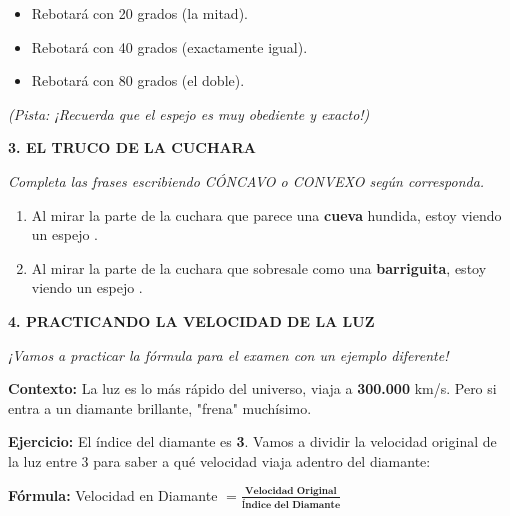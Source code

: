 \documentclass[12pt, letterpaper]{article}
\newcommand{\boxfill}[1][2.5cm]{\tcbox[on line, size=minimal, colframe=valdark!80, colback=white, boxrule=0.5pt, arc=1mm, boxsep=3pt, left=2pt, right=2pt, top=2pt, bottom=2pt]{\hspace*{#1}\vphantom{M}}}
\begin{document}
\vspace{0.2cm}
\begin{itemize}[itemsep=0.3cm]
    \item[$\square$] Rebotará con 20 grados (la mitad).
    \item[$\square$] Rebotará con 40 grados (exactamente igual).
    \item[$\square$] Rebotará con 80 grados (el doble).
\end{itemize}
\noindent \textit{(Pista: ¡Recuerda que el espejo es muy obediente y exacto!)}

\vspace{0.6cm}

\noindent \textbf{\textcolor{valblue}{3. EL TRUCO DE LA CUCHARA}}

\vspace{0.2cm}
\noindent \textit{Completa las frases escribiendo CÓNCAVO o CONVEXO según corresponda.}

\vspace{0.2cm}
\begin{enumerate}[label=\Alph*), itemsep=0.4cm]
    \item Al mirar la parte de la cuchara que parece una \textbf{cueva} hundida, estoy viendo un espejo \boxfill.
    \item Al mirar la parte de la cuchara que sobresale como una \textbf{barriguita}, estoy viendo un espejo \boxfill.
\end{enumerate}

\newpage %

\noindent \textbf{\textcolor{valblue}{4. PRACTICANDO LA VELOCIDAD DE LA LUZ}}

\vspace{0.2cm}
\noindent \textit{¡Vamos a practicar la fórmula para el examen con un ejemplo diferente!}

\vspace{0.2cm}
\noindent \textbf{Contexto:} La luz es lo más rápido del universo, viaja a \textbf{300.000} km/s. Pero si entra a un diamante brillante, "frena" muchísimo.

\vspace{0.2cm}
\noindent \textbf{Ejercicio:} El índice del diamante es \textbf{3}. Vamos a dividir la velocidad original de la luz entre 3 para saber a qué velocidad viaja adentro del diamante:

\vspace{0.4cm}
\begin{center}
    \textbf{Fórmula:} \quad Velocidad en Diamante $= \frac{\textbf{Velocidad Original}}{\textbf{Índice del Diamante}}$
\end{center}
\end{document}
